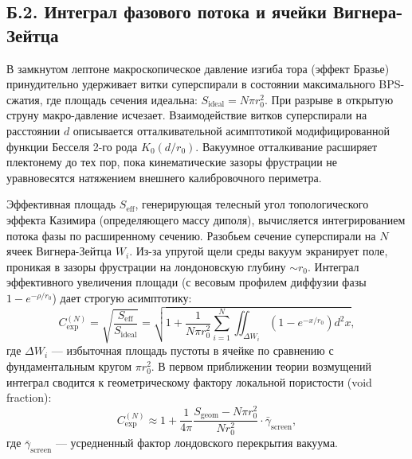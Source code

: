 \documentclass[11pt,a4paper]{article}
\begin{document}
\subsection*{Б.2. Интеграл фазового потока и ячейки Вигнера-Зейтца}
В замкнутом лептоне макроскопическое давление изгиба тора (эффект Бразье) принудительно удерживает витки суперспирали в состоянии максимального BPS-сжатия, где площадь сечения идеальна: $S_{\text{ideal}} = N \pi r_0^2$. 
При разрыве в открытую струну макро-давление исчезает. Взаимодействие витков суперспирали на расстоянии $d$ описывается отталкивательной асимптотикой модифицированной функции Бесселя 2-го рода $K_0(d/r_0)$. Вакуумное отталкивание расширяет плектонему до тех пор, пока кинематические зазоры фрустрации не уравновесятся натяжением внешнего калибровочного периметра.

Эффективная площадь $S_{\text{eff}}$, генерирующая телесный угол топологического эффекта Казимира (определяющего массу диполя), вычисляется интегрированием потока фазы по расширенному сечению. Разобьем сечение суперспирали на $N$ ячеек Вигнера-Зейтца $W_i$. Из-за упругой щели среды вакуум экранирует поле, проникая в зазоры фрустрации на лондоновскую глубину $\sim r_0$.
Интеграл эффективного увеличения площади (с весовым профилем диффузии фазы $1 - e^{-\rho/r_0}$) дает строгую асимптотику:
\begin{equation}
C_{\text{exp}}^{(N)} = \sqrt{ \frac{S_{\text{eff}}}{S_{\text{ideal}}} } = \sqrt{ 1 + \frac{1}{N \pi r_0^2} \sum_{i=1}^N \iint_{\Delta W_i} \left(1 - e^{-x/r_0}\right) d^2x },
\end{equation}
где $\Delta W_i$ — избыточная площадь пустоты в ячейке по сравнению с фундаментальным кругом $\pi r_0^2$. В первом приближении теории возмущений интеграл сводится к геометрическому фактору локальной пористости (void fraction):
\begin{equation}
C_{\text{exp}}^{(N)} \approx 1 + \frac{1}{4\pi} \frac{S_{\text{geom}} - N \pi r_0^2}{N r_0^2} \cdot \bar{\gamma}_{\text{screen}},
\label{eq:cexp_approx}
\end{equation}
где $\bar{\gamma}_{\text{screen}}$ — усредненный фактор лондовского перекрытия вакуума.
\end{document}
